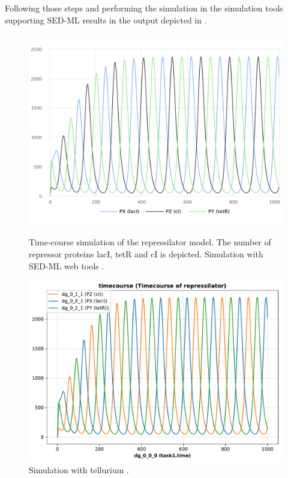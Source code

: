 Following those steps and performing the simulation in the simulation tools supporting SED-ML results in the output depicted in .

\begin{figure}[ht]
    \centering
    \begin{minipage}{0.47\textwidth}
        \centering
        \includegraphics[width=1.0\textwidth]{examples/repressilator/results/sedml_webtools/timecourse}
        \caption{Time-course simulation of the repressilator model. The number of repressor proteins lacI, tetR and cI is depicted. Simulation with SED-ML web tools \citep{bergmann2017sed}.}
    \end{minipage}\hfill
    \begin{minipage}{0.47\textwidth}
        \centering
        \includegraphics[width=1.0\textwidth]{examples/repressilator/results/tellurium/timecourse}
        \caption{Simulation with tellurium \citep{tellurium}.}
    \end{minipage}
    \label{fig:rep_tc}
\end{figure}

